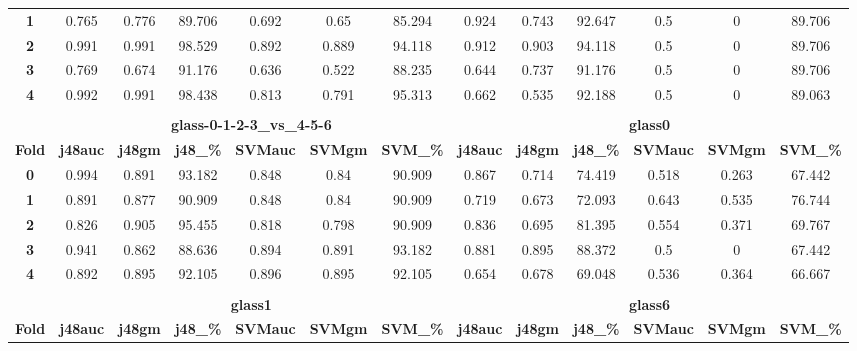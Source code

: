 {{\begin{tabular}{c|cccccc|cccccc}
\textbf{1} & 0.765 & 0.776 & 89.706 & 0.692 & 0.65  & 85.294 & 0.924 & 0.743 & 92.647 & 0.5   & 0     & 89.706 \\
\textbf{2} & 0.991 & 0.991 & 98.529 & 0.892 & 0.889 & 94.118 & 0.912 & 0.903 & 94.118 & 0.5   & 0     & 89.706 \\
\textbf{3} & 0.769 & 0.674 & 91.176 & 0.636 & 0.522 & 88.235 & 0.644 & 0.737 & 91.176 & 0.5   & 0     & 89.706 \\
\textbf{4} & 0.992 & 0.991 & 98.438 & 0.813 & 0.791 & 95.313 & 0.662 & 0.535 & 92.188 & 0.5   & 0     & 89.063 \\
\multicolumn{1}{c}{} &       &       &       &       &       & \multicolumn{1}{c}{} &       &       &       &       &       &  \\
\multicolumn{1}{c}{} & \multicolumn{6}{c|}{\textbf{glass-0-1-2-3\_vs\_4-5-6}} & \multicolumn{6}{c}{\textbf{glass0}} \\
\midrule
\textbf{Fold} & \textbf{j48auc} & \textbf{j48gm} & \textbf{j48\_\%} & \textbf{SVMauc} & \textbf{SVMgm} & \textbf{SVM\_\%} & \textbf{j48auc} & \textbf{j48gm} & \textbf{j48\_\%} & \textbf{SVMauc} & \textbf{SVMgm} & \textbf{SVM\_\%} \\
\midrule
\textbf{0} & 0.994 & 0.891 & 93.182 & 0.848 & 0.84  & 90.909 & 0.867 & 0.714 & 74.419 & 0.518 & 0.263 & 67.442 \\
\textbf{1} & 0.891 & 0.877 & 90.909 & 0.848 & 0.84  & 90.909 & 0.719 & 0.673 & 72.093 & 0.643 & 0.535 & 76.744 \\
\textbf{2} & 0.826 & 0.905 & 95.455 & 0.818 & 0.798 & 90.909 & 0.836 & 0.695 & 81.395 & 0.554 & 0.371 & 69.767 \\
\textbf{3} & 0.941 & 0.862 & 88.636 & 0.894 & 0.891 & 93.182 & 0.881 & 0.895 & 88.372 & 0.5   & 0     & 67.442 \\
\textbf{4} & 0.892 & 0.895 & 92.105 & 0.896 & 0.895 & 92.105 & 0.654 & 0.678 & 69.048 & 0.536 & 0.364 & 66.667 \\
\multicolumn{1}{c}{} &       &       &       &       &       & \multicolumn{1}{c}{} &       &       &       &       &       &  \\
\multicolumn{1}{c}{} & \multicolumn{6}{c|}{\textbf{glass1}}          & \multicolumn{6}{c}{\textbf{glass6}} \\
\midrule
\textbf{Fold} & \textbf{j48auc} & \textbf{j48gm} & \textbf{j48\_\%} & \textbf{SVMauc} & \textbf{SVMgm} & \textbf{SVM\_\%} & \textbf{j48auc} & \textbf{j48gm} & \textbf{j48\_\%} & \textbf{SVMauc} & \textbf{SVMgm} & \textbf{SVM\_\%} \\

\end{tabular}}}
